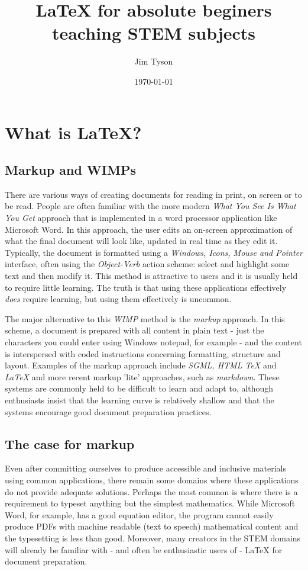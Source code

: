 \documentclass[]{article}
\title{LaTeX for absolute beginers teaching STEM subjects}
\author{Jim Tyson}
\date{\today}
\begin{document}
\onehalfspacing

\maketitle
\tableofcontents

\section{What is \LaTeX{}?}

\subsection{Markup and WIMPs}

There are various ways of creating documents for reading in print, on screen or to be read.  People are often familiar with the more modern \emph{What You See Is What You Get} approach that is implemented in a word processor application like Microsoft Word.  In this approach, the user edits an on-screen approximation of what the final document will look like, updated in real time as they edit it.  Typically, the document is formatted using a \emph{Windows, Icons, Mouse and Pointer} interface, often using the \emph{Object-Verb} action scheme: select and highlight some text and then modify it.  This method is attractive to users and it is usually held to require little learning.  The truth is that using these applications effectively \emph{does} require learning, but using them effectively is uncommon.

The major alternative to this \emph{WIMP} method is the \emph{markup} approach.  In this scheme, a document is prepared with all content in plain text - just the characters you could enter using Windows notepad, for example - and the content is interspersed with coded instructions concerning formatting, structure and layout.  Examples of the markup approach include \emph{SGML, HTML \TeX{}} and \emph{\LaTeX{}} and more recent markup 'lite' approaches, such as \emph{markdown}.  These systems are commonly held to be difficult to learn and adapt to, although enthusiasts insist that the learning curve is relatively shallow and that the systems encourage good document preparation practices.

\subsection{The case for markup}

Even after committing ourselves to produce accessible and inclusive materials using common applications, there remain some domains where these applications do not provide adequate solutions.  Perhaps the most common is where there is a requirement to typeset anything but the simplest mathematics.  While Microsoft Word, for example, has a good equation editor, the program cannot easily produce PDFs with machine readable (text to speech) mathematical content and the typesetting is less than good.  Moreover, many creators in the STEM domains will already be familiar with - and often be enthusiastic users of - LaTeX for document preparation.
\end{document}
